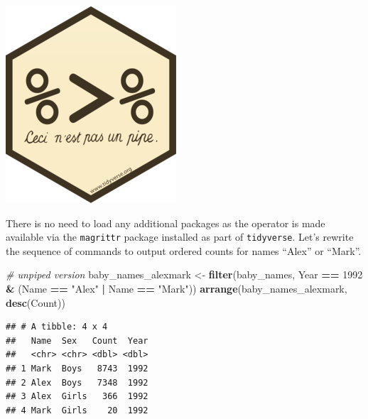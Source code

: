 \documentclass[
]{book}
\newenvironment{Shaded}{\begin{snugshade}}{\end{snugshade}}
\newcommand{\CommentTok}[1]{\textcolor[rgb]{0.56,0.35,0.01}{\textit{#1}}}
\newcommand{\DecValTok}[1]{\textcolor[rgb]{0.00,0.00,0.81}{#1}}
\newcommand{\KeywordTok}[1]{\textcolor[rgb]{0.13,0.29,0.53}{\textbf{#1}}}
\newcommand{\NormalTok}[1]{#1}
\newcommand{\OperatorTok}[1]{\textcolor[rgb]{0.81,0.36,0.00}{\textbf{#1}}}
\newcommand{\StringTok}[1]{\textcolor[rgb]{0.31,0.60,0.02}{#1}}
\begin{document}
\includegraphics{R/Rintro/images/magrittr.png}

There is no need to load any additional packages as the operator is made
available via the \texttt{magrittr} package installed as part of \texttt{tidyverse}. Let's
rewrite the sequence of commands to output ordered counts for names
``Alex'' or ``Mark''.

\begin{Shaded}
\begin{Highlighting}[]
\CommentTok{# unpiped version}
\NormalTok{baby_names_alexmark <-}\StringTok{ }\KeywordTok{filter}\NormalTok{(baby_names, Year }\OperatorTok{==}\StringTok{ }\DecValTok{1992} \OperatorTok{&}\StringTok{ }\NormalTok{(Name }\OperatorTok{==}\StringTok{ "Alex"} \OperatorTok{|}\StringTok{ }\NormalTok{Name }\OperatorTok{==}\StringTok{ "Mark"}\NormalTok{))}
\KeywordTok{arrange}\NormalTok{(baby_names_alexmark, }\KeywordTok{desc}\NormalTok{(Count))}
\end{Highlighting}
\end{Shaded}

\begin{verbatim}
## # A tibble: 4 x 4
##   Name  Sex   Count  Year
##   <chr> <chr> <dbl> <dbl>
## 1 Mark  Boys   8743  1992
## 2 Alex  Boys   7348  1992
## 3 Alex  Girls   366  1992
## 4 Mark  Girls    20  1992
\end{verbatim}

\begin{Shaded}
\end{Shaded}
\end{document}
